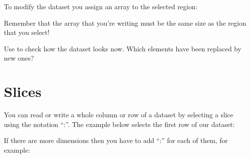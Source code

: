\documentclass[letterpaper,10pt,english]{sphinxmanual}
\begin{document}
\begin{sphinxVerbatim}[commandchars=\\\{\}]
  \PYG{p}{[} \PYG{p}{]}
\end{sphinxVerbatim}

\sphinxAtStartPar
To modify the dataset you assign an array to the selected region:

\begin{sphinxVerbatim}[commandchars=\\\{\}]
\PYG{p}{[} \PYG{p}{]}  \PYG{p}{[}\PYG{p}{[}\PYG{p}{]} \PYG{p}{[}\PYG{p}{]}\PYG{p}{]}
\end{sphinxVerbatim}

\sphinxAtStartPar
Remember that the array that you’re writing must be the same size as the region that you select!

\sphinxAtStartPar
Use  to check how the dataset looks now. Which elements have been replaced by new ones?


\section{Slices}
\label{\detokenize{index:slices}}
\sphinxAtStartPar
You can read or write a whole column or row of a dataset by selecting a slice using the notation “:”. The example below selects the first row of our dataset:

\begin{sphinxVerbatim}[commandchars=\\\{\}]
\PYG{p}{[}\PYG{p}{]}
\end{sphinxVerbatim}

\sphinxAtStartPar
If there are more dimensions then you have to add “:” for each of them, for example:

\begin{sphinxVerbatim}[commandchars=\\\{\}]
\PYG{p}{[}\PYG{p}{]}
\end{sphinxVerbatim}
\end{document}
